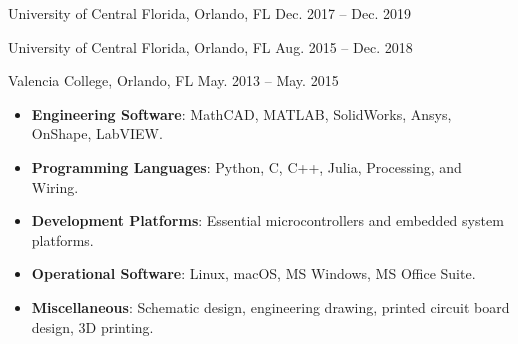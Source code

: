 

{University of Central Florida, Orlando, FL}
{Dec. 2017 -- Dec. 2019}{}

\divider

{University of Central Florida, Orlando, FL}
{Aug. 2015 -- Dec. 2018}{}

\divider

{Valencia College, Orlando, FL}
{May. 2013 -- May. 2015}{}



\justify
{}


\divider


\divider










\begin{itemize}
    \item \textbf{Engineering Software}: MathCAD, MATLAB, SolidWorks, Ansys, OnShape, LabVIEW.
    
    \item \textbf{Programming Languages}: Python, C, C++, Julia, Processing, and Wiring.
    
    \item \textbf{Development Platforms}: Essential microcontrollers and embedded system platforms.
    
    \item \textbf{Operational Software}: Linux, macOS, MS Windows, MS Office Suite.
    
    \item \textbf{Miscellaneous}: Schematic design, engineering drawing, printed circuit board design, 3D printing.
\end{itemize}

